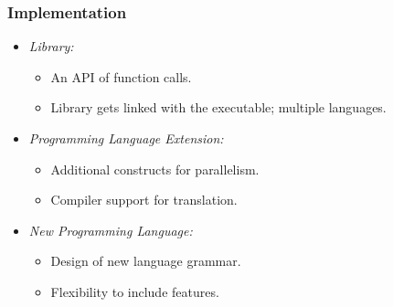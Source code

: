 \begin{frame}\frametitle{Implementation}

\vspace{5mm}
\begin{itemize}
\item {\Large \textit{Library:}}
\begin{itemize}
\item {\large An API of function calls.}
\vspace{1mm}
\item {\large Library gets linked with the executable; multiple languages.}
\end{itemize}
\vspace{5mm}
\item {\Large \textit{Programming Language Extension:} }
\begin{itemize}
\item {\large Additional constructs for parallelism.}
\vspace{1mm}
\item {\large Compiler support for translation.}
\end{itemize}
\vspace{5mm}
\item {\Large \textit{New Programming Language:}}
\begin{itemize}
\item {\large Design of new language grammar.}
\vspace{1mm}
\item {\large Flexibility to include features.}
\end{itemize}
\end{itemize}

\end{frame}

{
\begin{frame}[plain]
\end{frame}
}

